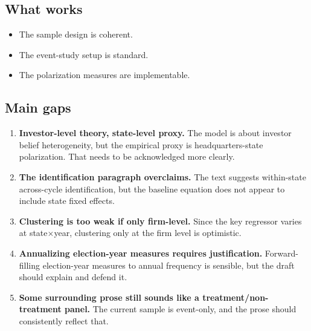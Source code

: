 \documentclass[12pt]{article}
\begin{document}
\subsection*{What works}
\begin{itemize}[leftmargin=1.5em]
    \item The sample design is coherent.
    \item The event-study setup is standard.
    \item The polarization measures are implementable.
\end{itemize}

\subsection*{Main gaps}
\begin{enumerate}[label=\textbf{\arabic*.}, leftmargin=1.75em]
    \item \textbf{Investor-level theory, state-level proxy.} The model is about investor belief heterogeneity, but the empirical proxy is headquarters-state polarization. That needs to be acknowledged more clearly.
    \item \textbf{The identification paragraph overclaims.} The text suggests within-state across-cycle identification, but the baseline equation does not appear to include state fixed effects.
    \item \textbf{Clustering is too weak if only firm-level.} Since the key regressor varies at state\(\times\)year, clustering only at the firm level is optimistic.
    \item \textbf{Annualizing election-year measures requires justification.} Forward-filling election-year measures to annual frequency is sensible, but the draft should explain and defend it.
    \item \textbf{Some surrounding prose still sounds like a treatment/non-treatment panel.} The current sample is event-only, and the prose should consistently reflect that.
\end{enumerate}
\end{document}
